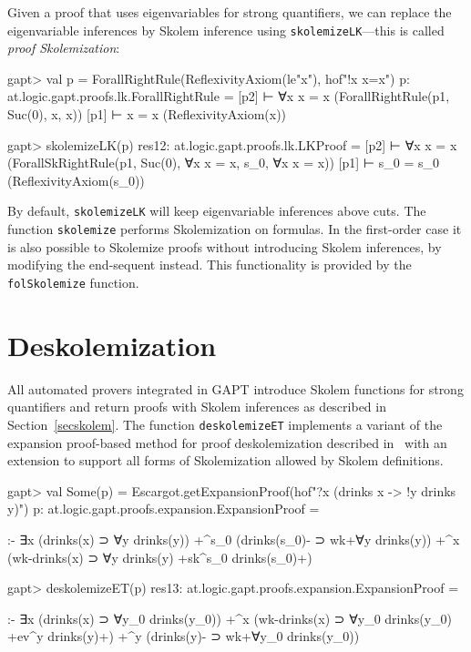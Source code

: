 \documentclass[a4paper,11pt]{book}
\begin{document}
Given a proof that uses eigenvariables for strong quantifiers, we can replace
the eigenvariable inferences by Skolem inference using
\texttt{skolemizeLK}---this is called \emph{proof Skolemization}:
\begin{clilisting}
gapt> val p = ForallRightRule(ReflexivityAxiom(le"x"), hof"!x x=x")
p: at.logic.gapt.proofs.lk.ForallRightRule =
[p2]  ⊢ ∀x x = x    (ForallRightRule(p1, Suc(0), x, x))
[p1]  ⊢ x = x    (ReflexivityAxiom(x))

gapt> skolemizeLK(p)
res12: at.logic.gapt.proofs.lk.LKProof =
[p2]  ⊢ ∀x x = x    (ForallSkRightRule(p1, Suc(0), ∀x x = x, s_0, ∀x x = x))
[p1]  ⊢ s_0 = s_0    (ReflexivityAxiom(s_0))

\end{clilisting}

By default, \texttt{skolemizeLK} will keep eigenvariable inferences above cuts.
The function \texttt{skolemize} performs Skolemization on formulas.
In the first-order case it is also possible to Skolemize proofs without
introducing Skolem inferences, by modifying the end-sequent instead.  This
functionality is provided by the \texttt{folSkolemize} function.

\section{Deskolemization}

All automated provers integrated in GAPT introduce Skolem functions for strong
quantifiers and return proofs with Skolem inferences as described in
Section~\ref{secskolem}.  The function \texttt{deskolemizeET} implements a
variant of the expansion proof-based method for proof deskolemization
described in~\cite{Baaz2012Complexity} with an extension to support all forms
of Skolemization allowed by Skolem definitions.
\begin{clilisting}
gapt> val Some(p) = Escargot.getExpansionProof(hof"?x (drinks x -> !y drinks y)")
p: at.logic.gapt.proofs.expansion.ExpansionProof =

:-
∃x (drinks(x) ⊃ ∀y drinks(y))
  +^{s_0} (drinks(s_0)- ⊃ wk+{∀y drinks(y)})
  +^{x} (wk-{drinks(x)} ⊃ ∀y drinks(y) +sk^{s_0} drinks(s_0)+)

gapt> deskolemizeET(p)
res13: at.logic.gapt.proofs.expansion.ExpansionProof =

:-
∃x (drinks(x) ⊃ ∀y_0 drinks(y_0))
  +^{x} (wk-{drinks(x)} ⊃ ∀y_0 drinks(y_0) +ev^{y} drinks(y)+)
  +^{y} (drinks(y)- ⊃ wk+{∀y_0 drinks(y_0)})

\end{clilisting}
\end{document}
